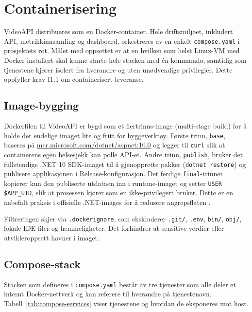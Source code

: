 \section{Containerisering}
\label{sec:docker}

VideoAPI distribueres som en Docker-container. Hele driftsmiljøet, inkludert API, metrikkinnsamling og dashboard, orkestreres av en enkelt \texttt{compose.yaml} i prosjektets rot. Målet med oppsettet er at en hvilken som helst Linux-VM med Docker installert skal kunne starte hele stacken med én kommando, samtidig som tjenestene kjører isolert fra hverandre og uten unødvendige privilegier. Dette oppfyller krav I1.1 \cite{hdo_kravspec} om containerisert leveranse.

\subsection{Image-bygging}
\label{subsec:docker-image}

Dockerfilen til VideoAPI er bygd som et flertrinns-image (multi-stage build) for å holde det endelige imaget lite og fritt for byggeverktøy. Første trinn, \texttt{base}, baseres på \url{mcr.microsoft.com/dotnet/aspnet:10.0} og legger til \texttt{curl} slik at containerens egen helsesjekk kan polle API-et. Andre trinn, \texttt{publish}, bruker det fullstendige .NET 10 SDK-imaget til å gjenopprette pakker (\texttt{dotnet restore}) og publisere applikasjonen i Release-konfigurasjon. Det ferdige \texttt{final}-trinnet kopierer kun den publiserte utdataen inn i runtime-imaget og setter \texttt{USER \$APP\_UID}, slik at prosessen kjører som en ikke-privilegert bruker. Dette er en anbefalt praksis i offisielle .NET-images for å redusere angrepsflaten \cite{aspnet_rootless}.

Filtreringen skjer via \texttt{.dockerignore}, som ekskluderer \texttt{.git/}, \texttt{.env}, \texttt{bin/}, \texttt{obj/}, lokale IDE-filer og hemmeligheter. Det forhindrer at sensitive verdier eller utvikleroppsett havner i imaget.

\subsection{Compose-stack}
\label{subsec:docker-compose}

Stacken som defineres i \texttt{compose.yaml} består av tre tjenester som alle deler et internt Docker-nettverk og kan referere til hverandre på tjenestenavn. Tabell~\ref{tab:compose-services} viser tjenestene og hvordan de eksponeres mot host.

